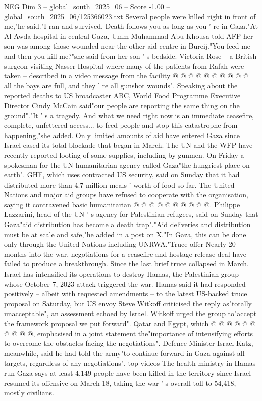 \begin{textsample}{NEG Dim 3 – global\_south\_2025\_06 – Score -1.00 – global\_south\_2025\_06/125366023.txt}
Several people were killed right in front of me,"he said."I ran and survived.
Death follows you as long as you ' re in Gaza."At Al-Awda hospital in central Gaza, Umm Muhammad Abu Khousa told AFP her son was among those wounded near the other aid centre in Bureij."You feed me and then you kill me?"she said from her son ' s bedside.
Victoria Rose -- a British surgeon visiting Nasser Hospital where many of the patients from Rafah were taken -- described in a video message from the facility @ @ @ @ @ @ @ @ @ @ all the bays are full, and they ' re all gunshot wounds".
Speaking about the reported deaths to US broadcaster ABC, World Food Programme Executive Director Cindy McCain said"our people are reporting the same thing on the ground"."It ' s a tragedy.
And what we need right now is an immediate ceasefire, complete, unfettered access... to feed people and stop this catastrophe from happening,"she added.
Only limited amounts of aid have entered Gaza since Israel eased its total blockade that began in March.
The UN and the WFP have recently reported looting of some supplies, including by gunmen.
On Friday a spokesman for the UN humanitarian agency called Gaza"the hungriest place on earth".
GHF, which uses contracted US security, said on Sunday that it had distributed more than 4.7 million meals ' worth of food so far.
The United Nations and major aid groups have refused to cooperate with the organisation, saying it contravened basic humanitarian @ @ @ @ @ @ @ @ @ @.
Philippe Lazzarini, head of the UN ' s agency for Palestinian refugees, said on Sunday that Gaza"aid distribution has become a death trap"."Aid deliveries and distribution must be at scale and safe,"he added in a post on X."In Gaza, this can be done only through the United Nations including UNRWA."Truce offer Nearly 20 months into the war, negotiations for a ceasefire and hostage release deal have failed to produce a breakthrough.
Since the last brief truce collapsed in March, Israel has intensified its operations to destroy Hamas, the Palestinian group whose October 7, 2023 attack triggered the war.
Hamas said it had responded positively -- albeit with requested amendments -- to the latest US-backed truce proposal on Saturday, but US envoy Steve Witkoff criticised the reply as"totally unacceptable", an assessment echoed by Israel.
Witkoff urged the group to"accept the framework proposal we put forward".
Qatar and Egypt, which @ @ @ @ @ @ @ @ @ @, emphasised in a joint statement the"importance of intensifying efforts to overcome the obstacles facing the negotiations".
Defence Minister Israel Katz, meanwhile, said he had told the army"to continue forward in Gaza against all targets, regardless of any negotiations". top videos The health ministry in Hamas-run Gaza says at least 4,149 people have been killed in the territory since Israel resumed its offensive on March 18, taking the war ' s overall toll to 54,418, mostly civilians.

\end{textsample}
